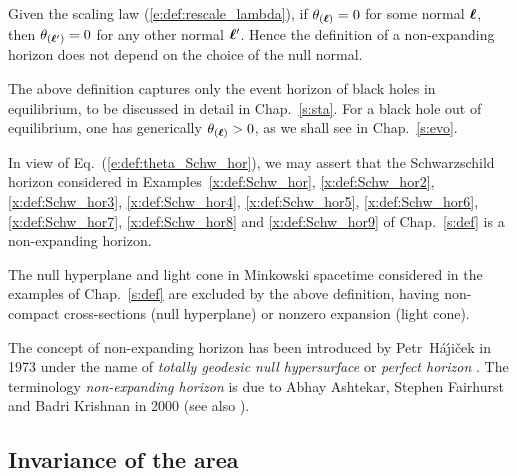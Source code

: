 \begin{remark}
Given the scaling law (\ref{e:def:rescale_lambda}),
if $\theta_{(\bm{\ell})} = 0$ for some normal $\bm{\ell}$, then  $\theta_{(\bm{\ell}')} = 0$
for any other normal $\bm{\ell}'$. Hence the definition of a non-expanding horizon
does not depend on the choice of the null normal.
\end{remark}

The above definition captures only
the event horizon of black holes in equilibrium, to be discussed in detail
in Chap.~\ref{s:sta}.
For a black hole out of equilibrium, one has generically $\theta_{(\bm{\ell})} > 0$,
as we shall see in Chap.~\ref{s:evo}.

\begin{example}
In view of Eq.~(\ref{e:def:theta_Schw_hor}), we may assert that the
Schwarz\-schild horizon considered in Examples~\ref{x:def:Schw_hor}, \ref{x:def:Schw_hor2},
\ref{x:def:Schw_hor3}, \ref{x:def:Schw_hor4}, \ref{x:def:Schw_hor5}, \ref{x:def:Schw_hor6},
\ref{x:def:Schw_hor7}, \ref{x:def:Schw_hor8} and \ref{x:def:Schw_hor9}
of Chap.~\ref{s:def}
is a non-expanding horizon.
\end{example}

\begin{example}
The null hyperplane and light cone in Minkowski spacetime considered
in the examples of Chap.~\ref{s:def} are excluded by the above definition,
having non-compact cross-sections (null hyperplane) or nonzero expansion
(light cone).
\end{example}

\begin{hist}\label{h:neh:NEH}
The concept of non-expanding horizon has been introduced by
Petr~H\'a\'\j i\v{c}ek
in 1973 under the name of \emph{totally geodesic null hypersurface} \cite{Hajic73a}
or \emph{perfect horizon} \cite{Hajic73b,Hajic74}.
The terminology \emph{non-expanding horizon} is due to
Abhay Ashtekar, Stephen Fairhurst
and Badri Krishnan in 2000 \cite{AshteFK00} (see also \cite{AshteBL02}).
\end{hist}

\subsection{Invariance of the area} \label{s:neh:invar_area}

